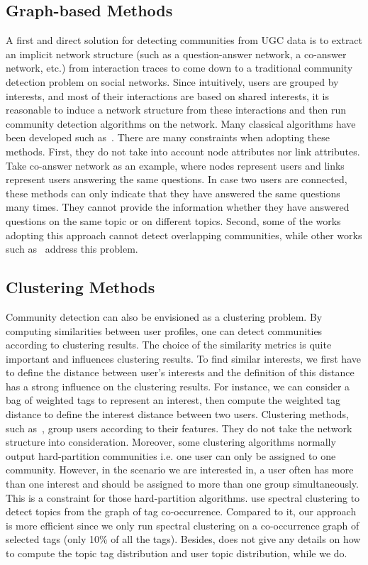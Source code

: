 \subsection{Graph-based Methods}
A first and direct solution for detecting communities from UGC data is to extract an implicit network structure (such as a question-answer network, a co-answer network, etc.) from interaction traces to come down to a traditional community detection problem on social networks. Since intuitively, users are grouped by interests, and most of their interactions are based on shared interests, it is reasonable to induce a network structure from these interactions and then run community detection algorithms on the network. Many classical algorithms have been developed such as~\cite{DBLP:journals/csur/XieKS13}\cite{ahn2010link}. There are many constraints when adopting these methods. First, they do not take into account node attributes nor link attributes. Take co-answer network as an example, where nodes represent users and links represent users answering the same questions. In case two users are connected, these methods can only indicate that they have answered the same questions many times. They cannot provide the information whether they have answered questions on the same topic or on different topics. Second, some of the works adopting this approach cannot detect overlapping communities, while other works such as~\cite{DBLP:journals/csur/XieKS13} address this problem.

\subsection{Clustering Methods}
Community detection can also be envisioned as a clustering problem. By computing similarities between user profiles, one can detect communities according to clustering results. The choice of the similarity metrics is quite important and influences clustering results. 
To find similar interests, we first have to define the distance between user's interests and the definition of this distance has a strong influence on the clustering results. For instance, we can consider a bag of weighted tags to represent an interest, then compute the weighted tag distance to define the interest distance between two users.
Clustering methods, such as~\cite{DBLP:conf/sigmod/XuKWCC12}\cite{DBLP:conf/icwsm/GargiLMY11}, group users according to their features. They do not take the network structure into consideration. Moreover, some clustering algorithms normally output hard-partition communities i.e. one user can only be assigned to one community. However, in the scenario we are interested in, a user often has more than one interest and should be assigned to more than one group simultaneously. This is a constraint for those hard-partition algorithms. 
\cite{Chang:2013} use spectral clustering to detect topics from the graph of tag co-occurrence. Compared to it, our approach is more efficient since we only run spectral clustering on a co-occurrence graph of selected tags (only 10\% of all the tags). Besides, \cite{Chang:2013} does not give any details on how to compute the topic tag distribution and user topic distribution, while we do.

